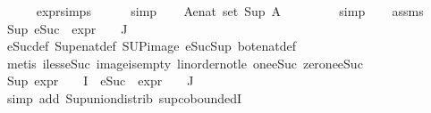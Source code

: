 \begin{isabellebody}
\ \ \ \ \isamarkupfalse%
\ expr{\isachardot}{\kern0pt}simps\isanewline
\ \ \ \ \isamarkupfalse%
\ simp\isanewline
\ \ \isamarkupfalse%
\ {\isachardoublequoteopen}{\isasymforall}A{\isacharcolon}{\kern0pt}{\isacharcolon}{\kern0pt}enat\ set{\isachardot}{\kern0pt}\ Sup\ A\ {\isasymge}\ {}{\isachardoublequoteclose}\ \isanewline
\ \ \ \ \isamarkupfalse%
\ simp\isanewline
\ \ \isamarkupfalse%
\ assms\ \isamarkupfalse%
\ {\isachardoublequoteopen}Sup\ {\isacharparenleft}{\kern0pt}{\isacharparenleft}{\kern0pt}eSuc\ {\isasymcirc}\ expr{\isacharunderscore}{\kern0pt}{}\ {\isasymcirc}\ {\isasymPhi}{\isacharparenright}{\kern0pt}\ {\isacharbackquote}{\kern0pt}\ J{\isacharparenright}{\kern0pt}\ {\isasymge}\ {}{\isachardoublequoteclose}\isanewline
\ \ \ \ \isamarkupfalse%
\ eSuc{\isacharunderscore}{\kern0pt}def\ Sup{\isacharunderscore}{\kern0pt}enat{\isacharunderscore}{\kern0pt}def\ SUP{\isacharunderscore}{\kern0pt}image\ eSuc{\isacharunderscore}{\kern0pt}Sup\ bot{\isacharunderscore}{\kern0pt}enat{\isacharunderscore}{\kern0pt}def\isanewline
\ \ \ \ \isamarkupfalse%
\ {\isacharparenleft}{\kern0pt}metis\ iless{\isacharunderscore}{\kern0pt}eSuc{}\ image{\isacharunderscore}{\kern0pt}is{\isacharunderscore}{\kern0pt}empty\ linorder{\isacharunderscore}{\kern0pt}not{\isacharunderscore}{\kern0pt}le\ one{\isacharunderscore}{\kern0pt}eSuc\ zero{\isacharunderscore}{\kern0pt}ne{\isacharunderscore}{\kern0pt}eSuc{\isacharparenright}{\kern0pt}\isanewline
\ \ \isamarkupfalse%
\ {\isachardoublequoteopen}{\isacharparenleft}{\kern0pt}Sup\ {\isacharparenleft}{\kern0pt}{\isacharparenleft}{\kern0pt}expr{\isacharunderscore}{\kern0pt}{}\ {\isasymcirc}\ {\isasymPhi}{\isacharparenright}{\kern0pt}\ {\isacharbackquote}{\kern0pt}\ I\ {\isasymunion}\ {\isacharparenleft}{\kern0pt}{\isacharparenleft}{\kern0pt}eSuc\ {\isasymcirc}\ expr{\isacharunderscore}{\kern0pt}{}\ {\isasymcirc}\ {\isasymPhi}{\isacharparenright}{\kern0pt}\ {\isacharbackquote}{\kern0pt}\ J{\isacharparenright}{\kern0pt}{\isacharparenright}{\kern0pt}{\isacharparenright}{\kern0pt}\ {\isasymge}\ {}{\isachardoublequoteclose}\isanewline
\ \ \ \ \isamarkupfalse%
\ {\isacharparenleft}{\kern0pt}simp\ add{\isacharcolon}{\kern0pt}\ Sup{\isacharunderscore}{\kern0pt}union{\isacharunderscore}{\kern0pt}distrib\ sup{\isachardot}{\kern0pt}coboundedI{}{\isacharparenright}{\kern0pt}\isanewline
\ \ \isamarkupfalse%

\end{isabellebody}
